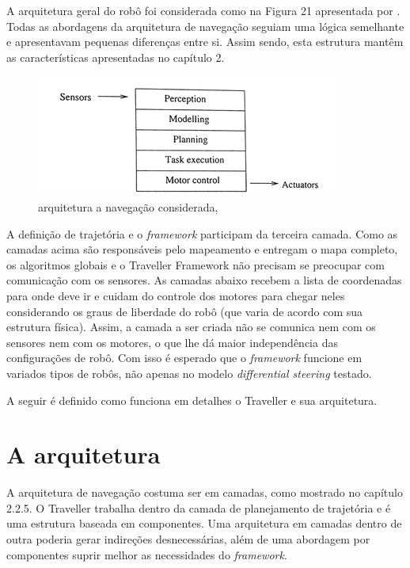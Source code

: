 A arquitetura geral do robô foi considerada como na Figura 21 apresentada por \cite{Nehmzow2003}. Todas as abordagens da arquitetura de navegação seguiam uma lógica semelhante e apresentavam pequenas diferenças entre si. Assim sendo, esta estrutura mantêm as características apresentadas no capítulo 2.

\begin{figure}[h]
	\centering
	\label{fig21}
		\includegraphics[keepaspectratio=true,scale=1]{figuras/arqusada.jpg}
	\caption{arquitetura a navegação considerada, \cite{Nehmzow2003}}
\end{figure}

A definição de trajetória e o \textit{framework} participam da terceira camada. Como as camadas acima são responsáveis pelo mapeamento e entregam o mapa completo, os algoritmos globais e o Traveller Framework não precisam se preocupar com comunicação com os sensores. As camadas abaixo recebem a lista de coordenadas para onde deve ir e cuidam do controle dos motores para chegar neles considerando os graus de liberdade do robô (que varia de acordo com sua estrutura física). Assim, a camada a ser criada não se comunica nem com os sensores nem com os motores, o que lhe dá maior independência das configurações de robô. Com isso é esperado que o \textit{framework} funcione em variados tipos de robôs, não apenas no modelo \textit{differential steering} testado.

A seguir é definido como funciona em detalhes o Traveller e sua arquitetura.

\section{A arquitetura}

A arquitetura de navegação costuma ser em camadas, como mostrado no capítulo 2.2.5. O Traveller trabalha dentro da camada de planejamento de trajetória e é uma estrutura baseada em componentes. Uma arquitetura em camadas dentro de outra poderia gerar indireções desnecessárias, além de uma abordagem por componentes suprir melhor as necessidades do \textit{framework}.

